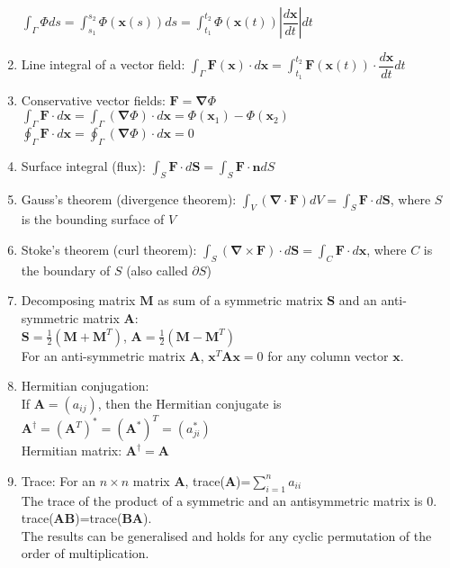 \documentclass[fleqn]{article}
\begin{document}
\begin{enumerate}
		$\displaystyle\int_\Gamma\Phi ds=\displaystyle\int_{s_1}^{s_2}\Phi(\bm{x}(s))ds=\displaystyle\int_{t_1}^{t_2}\Phi(\bm{x}(t))\left|\dfrac{d\bm{x}}{dt}\right|dt$
	\item Line integral of a vector field:\smallbreak
		$\displaystyle\int_\Gamma\bm{F}(\bm{x})\cdot d\bm{x}=\displaystyle\int_{t_1}^{t_2}\bm{F}(\bm{x}(t))\cdot\dfrac{d\bm{x}}{dt}dt$
	\item Conservative vector fields: $\bm{F}=\bm{\nabla}\Phi$\smallbreak
		$\displaystyle\int_\Gamma\bm{F}\cdot d\bm{x}=\displaystyle\int_\Gamma(\bm{\nabla}\Phi)\cdot d\bm{x}=\Phi(\bm{x}_1)-\Phi(\bm{x}_2)$\smallbreak
		$\displaystyle\oint_\Gamma\bm{F}\cdot d\bm{x}=\displaystyle\oint_\Gamma(\bm{\nabla}\Phi)\cdot d\bm{x}=0$
	\item Surface integral (flux):\smallbreak
		$\displaystyle\int_S\bm{F}\cdot d\bm{S}=\displaystyle\int_S\bm{F}\cdot\bm{n}dS$
	\item Gauss's theorem (divergence theorem):\smallbreak
		$\displaystyle\int_V(\bm{\nabla}\cdot\bm{F})dV=\displaystyle\int_S\bm{F}\cdot d\bm{S}$, where $S$ is the bounding surface of $V$
	\item Stoke's theorem (curl theorem):\smallbreak
		$\displaystyle\int_S(\bm{\nabla}\times\bm{F})\cdot d\bm{S}=\displaystyle\int_C\bm{F}\cdot d\bm{x}$, where $C$ is the boundary of $S$ (also called $\partial S$)
	\newpage
	\item Decomposing matrix $\bm{M}$ as sum of a symmetric matrix $\bm{S}$ and an anti-symmetric matrix $\bm{A}$: \\
		$\bm{S}=\frac{1}{2}(\bm{M}+\bm{M}^T)$, $\bm{A}=\frac{1}{2}(\bm{M}-\bm{M}^T)$\\
		For an anti-symmetric matrix $\bm{A}$, $\bm{x}^T\bm{Ax}=0$ for any column vector $\bm{x}$.
	\item Hermitian conjugation:\\
		If $\bm{A}=(a_{ij})$, then the Hermitian conjugate is $\bm{A}^\dagger=(\bm{A}^T)^*=(\bm{A}^*)^T=(a^*_{ji})$\\
		Hermitian matrix: $\bm{A}^\dagger=\bm{A}$
	\item Trace: 
		For an $n\times n$ matrix $\bm{A}$, trace($\bm{A}$)=$\displaystyle\sum_{i=1}^n a_{ii}$\\
		The trace of the product of a symmetric and an antisymmetric matrix is 0.\\
		trace($\bm{AB}$)=trace($\bm{BA}$).\\
		The results can be generalised and holds for any cyclic permutation of the order of multiplication.

\end{enumerate}
\end{document}
